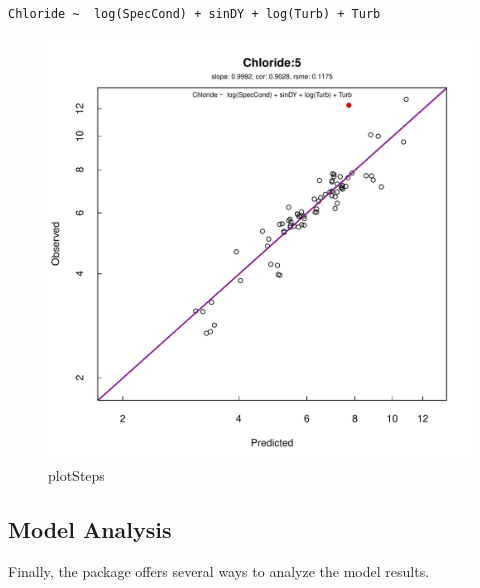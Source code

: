 \documentclass[a4paper,11pt]{article}\usepackage[]{graphicx}\usepackage[]{color}
\makeatletter
\def\maxwidth{ %
  \ifdim\Gin@nat@width>\linewidth
    \linewidth
  \else
    \Gin@nat@width
  \fi
}
\newenvironment{kframe}{%
 \def\at@end@of@kframe{}%
 \ifinner\ifhmode%
  \def\at@end@of@kframe{\end{minipage}}%
  \begin{minipage}{\columnwidth}%
 \fi\fi%
 \def\FrameCommand##1{\hskip\@totalleftmargin \hskip-\fboxsep
 \colorbox{shadecolor}{##1}\hskip-\fboxsep
     \hskip-\linewidth \hskip-\@totalleftmargin \hskip\columnwidth}%
 \MakeFramed {\advance\hsize-\width
   \@totalleftmargin\z@ \linewidth\hsize
   \@setminipage}}%
 {\par\unskip\endMakeFramed%
 \at@end@of@kframe}
\newenvironment{knitrout}{}{} %
\makeatother
\begin{document}
\begin{knitrout}
\begin{kframe}\begin{verbatim}
Chloride ~  log(SpecCond) + sinDY + log(Turb) + Turb 
\end{verbatim}
\end{kframe}\begin{figure}[]

\includegraphics[width=\maxwidth]{figure/plotSteps4} \caption[plotSteps]{plotSteps\label{fig:plotSteps4}}
\end{figure}


\end{knitrout}


\FloatBarrier
\subsection{Model Analysis}
Finally, the package offers several ways to analyze the model results.
\end{document}
